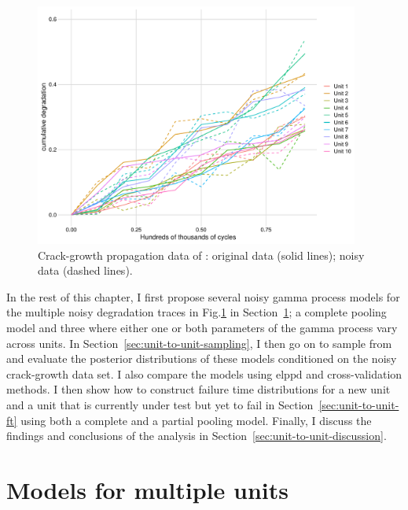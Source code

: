 \begin{figure}
   \centering
   \includegraphics[width=0.95\textwidth]{./figures/ch-5/noisy-crack-growth-data.pdf}
   \caption{Crack-growth propagation data of \citet{rodriguez-picon2018}: original data (solid lines); noisy data (dashed lines).}
   \label{fig:crack-growth-w-noise}
\end{figure}

In the rest of this chapter, I first propose several noisy gamma process models for the multiple noisy degradation traces in Fig.\ref{fig:crack-growth-w-noise} in Section~\ref{sec:unit-to-unit-models}; a complete pooling model and three where either one or both parameters of the gamma process vary across units. In Section~\ref{sec:unit-to-unit-sampling}, I then go on to sample from and evaluate the posterior distributions of these models conditioned on the noisy crack-growth data set. I also compare the models using $\mbox{elppd}$ and cross-validation methods. I then show how to construct failure time distributions for a new unit and a unit that is currently under test but yet to fail in Section~\ref{sec:unit-to-unit-ft} using both a complete and a partial pooling model. Finally, I discuss the findings and conclusions of the analysis in Section~\ref{sec:unit-to-unit-discussion}.

\section{Models for multiple units} \label{sec:unit-to-unit-models}

